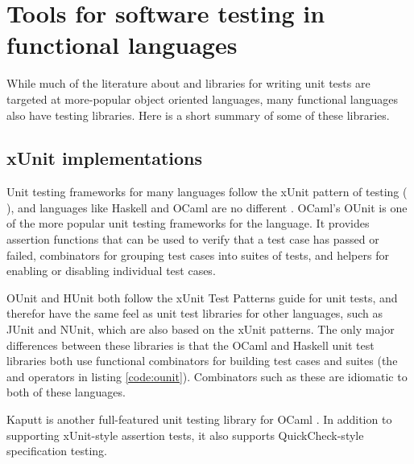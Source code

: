 \section{Tools for software testing in functional languages}
\label{testtools}

While much of the literature about and libraries for writing unit
tests are targeted at more-popular object oriented languages,
many functional languages also have testing libraries. Here is a short
summary of some of these libraries.

\subsection{xUnit implementations}

Unit testing frameworks for many languages follow the xUnit pattern of
testing (\cite{www:junit} \cite{www:nunit} \cite{www:ruby:unit}), and
languages like Haskell and OCaml are no different \cite{www:hunit}
\cite{www:ounit}. OCaml's OUnit is one of the more popular unit
testing frameworks for the language. It provides assertion functions
that can be used to verify that a test case has passed or failed,
combinators for grouping test cases into suites of tests, and helpers
for enabling or disabling individual test cases.



OUnit and HUnit both follow the xUnit Test Patterns guide for unit
tests, and therefor have the same feel as unit test libraries for
other languages, such as JUnit and NUnit, which are also based on the
xUnit patterns. The only major differences between these libraries is
that the OCaml and Haskell unit test libraries both use functional
combinators for building test cases and suites (the \code{>::} and
\code{>:::} operators in listing \ref{code:ounit}). Combinators such
as these are idiomatic to both of these languages.

Kaputt is another full-featured unit testing library for OCaml
\cite{www:kaputt}. In addition to supporting xUnit-style assertion
tests, it also supports QuickCheck-style specification testing.




